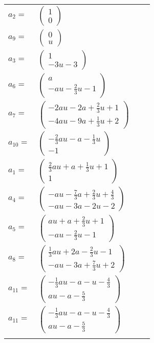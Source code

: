 \documentclass[1p]{elsarticle_modified}
\theoremstyle{definition}
\begin{document}
\begin{tabular}{m{7pt} m{180pt} m{7pt} m{180pt} }
\flushright $a_{2}=$&$\begin{pmatrix}1\\0\end{pmatrix}$ \\
\flushright $a_{9}=$&$\begin{pmatrix}0\\u\end{pmatrix}$ \\
\flushright $a_{3}=$&$\begin{pmatrix}1\\-3 u-3\end{pmatrix}$ \\
\flushright $a_{6}=$&$\begin{pmatrix}a\\- a u-\frac{2}{3} u-1\end{pmatrix}$ \\
\flushright $a_{7}=$&$\begin{pmatrix}-2 a u-2 a+\frac{2}{3} u+1\\-4 a u-9 a+\frac{1}{3} u+2\end{pmatrix}$ \\
\flushright $a_{10}=$&$\begin{pmatrix}-\frac{2}{3} a u- a-\frac{1}{3} u\\-1\end{pmatrix}$ \\
\flushright $a_{1}=$&$\begin{pmatrix}\frac{2}{3} a u+a+\frac{1}{3} u+1\\1\end{pmatrix}$ \\
\flushright $a_{4}=$&$\begin{pmatrix}- a u-\frac{7}{3} a+\frac{2}{3} u+\frac{4}{3}\\- a u-3 a-2 u-2\end{pmatrix}$ \\
\flushright $a_{5}=$&$\begin{pmatrix}a u+a+\frac{2}{3} u+1\\- a u-\frac{2}{3} u-1\end{pmatrix}$ \\
\flushright $a_{8}=$&$\begin{pmatrix}\frac{1}{3} a u+2 a-\frac{2}{3} u-1\\- a u-3 a+\frac{7}{3} u+2\end{pmatrix}$ \\
\flushright $a_{11}=$&$\begin{pmatrix}-\frac{1}{3} a u- a- u-\frac{4}{3}\\a u- a-\frac{5}{3}\end{pmatrix}$\\ \flushright $a_{11}=$&$\begin{pmatrix}-\frac{1}{3} a u- a- u-\frac{4}{3}\\a u- a-\frac{5}{3}\end{pmatrix}$\\&\end{tabular}
\end{document}
